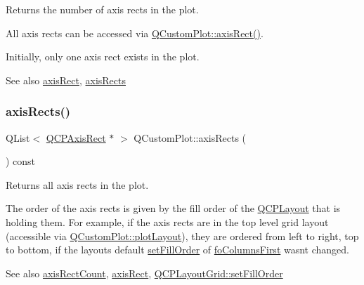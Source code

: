 Returns the number of axis rects in the plot.

All axis rects can be accessed via \hyperlink{classQCustomPlot_ae5eefcb5f6ca26689b1fd4f6e25b42f9}{Q\+Custom\+Plot\+::axis\+Rect()}.

Initially, only one axis rect exists in the plot.

\begin{DoxySeeAlso}{See also}
\hyperlink{classQCustomPlot_ae5eefcb5f6ca26689b1fd4f6e25b42f9}{axis\+Rect}, \hyperlink{classQCustomPlot_a12af771429e2d7e313c8c5d5fca068fe}{axis\+Rects} 
\end{DoxySeeAlso}
\mbox{\label{classQCustomPlot_a12af771429e2d7e313c8c5d5fca068fe}} 
\subsubsection{\texorpdfstring{axis\+Rects()}{axisRects()}}
{\footnotesize\ttfamily Q\+List$<$ \hyperlink{classQCPAxisRect}{Q\+C\+P\+Axis\+Rect} $\ast$ $>$ Q\+Custom\+Plot\+::axis\+Rects (\begin{DoxyParamCaption}{ }\end{DoxyParamCaption}) const}

Returns all axis rects in the plot.

The order of the axis rects is given by the fill order of the \hyperlink{classQCPLayout}{Q\+C\+P\+Layout} that is holding them. For example, if the axis rects are in the top level grid layout (accessible via \hyperlink{classQCustomPlot_af1a1f1f571237deb7c2bd34a5e9f018f}{Q\+Custom\+Plot\+::plot\+Layout}), they are ordered from left to right, top to bottom, if the layout\textquotesingle{}s default \hyperlink{classQCPLayoutGrid_affc2f3cfd22f28698c5b29b960d2a391}{set\+Fill\+Order} of \hyperlink{classQCPLayoutGrid_a7d49ee08773de6b2fd246edfed353ccaac4cb4b796ec4822d5894b47b51627fb3}{fo\+Columns\+First} wasn\textquotesingle{}t changed.

\begin{DoxySeeAlso}{See also}
\hyperlink{classQCustomPlot_a8f85940aaac50efb466287d9d2d04ec6}{axis\+Rect\+Count}, \hyperlink{classQCustomPlot_ae5eefcb5f6ca26689b1fd4f6e25b42f9}{axis\+Rect}, \hyperlink{classQCPLayoutGrid_affc2f3cfd22f28698c5b29b960d2a391}{Q\+C\+P\+Layout\+Grid\+::set\+Fill\+Order} 
\end{DoxySeeAlso}
\mbox{\label{classQCustomPlot_a0cd30e29b73efd6afe096e44bc5956f5}} 
